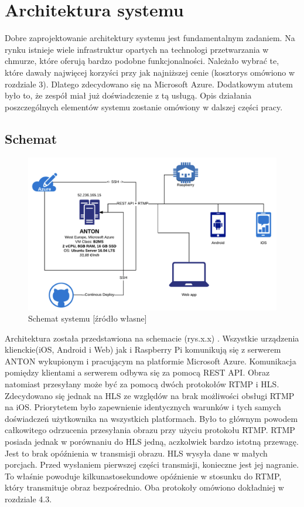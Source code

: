 \chapter{Architektura systemu}

Dobre zaprojektowanie architektury systemu jest fundamentalnym zadaniem. Na rynku istnieje wiele infrastruktur opartych na technologi przetwarzania w chmurze, które oferują bardzo podobne funkcjonalności. Należało wybrać te, które dawały najwięcej korzyści przy jak najniższej cenie (kosztorys omówiono w rozdziale 3). Dlatego zdecydowano się na Microsoft Azure. Dodatkowym atutem było to, że zespół miał już doświadczenie z tą usługą. Opis działania poszczególnych elementów systemu zostanie omówiony w dalszej części pracy.

\section{Schemat}

\begin{figure}[ht] %
   \centering
   \includegraphics[width=12cm]{anton.png} 
   \caption{Schemat systemu [źródło własne]}
\end{figure}

Architektura została przedstawiona na schemacie (rys.x.x) . Wszystkie urządzenia klienckie(iOS, Android i Web) jak i Raspberry Pi komunikują się z serwerem ANTON wykupionym i pracującym na platformie Microsoft Azure. Komunikacja pomiędzy klientami a serwerem odbywa się za pomocą REST API. Obraz natomiast przesyłany może być za pomocą dwóch protokołów RTMP i HLS. Zdecydowano się jednak na HLS ze względów na brak możliwości obsługi RTMP na iOS. Priorytetem było zapewnienie identycznych warunków i tych samych doświadczeń użytkownika na wszystkich platformach. Było to głównym powodem całkowitego odrzucenia przesyłania obrazu przy użyciu protokołu RTMP. RTMP posiada jednak w porównaniu do HLS jedną, aczkolwiek bardzo istotną przewagę. Jest to brak opóźnienia w transmisji obrazu. HLS wysyła dane w małych porcjach. Przed wysłaniem pierwszej części transmisji, konieczne jest jej nagranie. To właśnie powoduje kilkunastosekundowe opóźnienie w stosunku do RTMP, który transmituje obraz bezpośrednio. Oba protokoły omówiono dokładniej w rozdziale 4.3.

